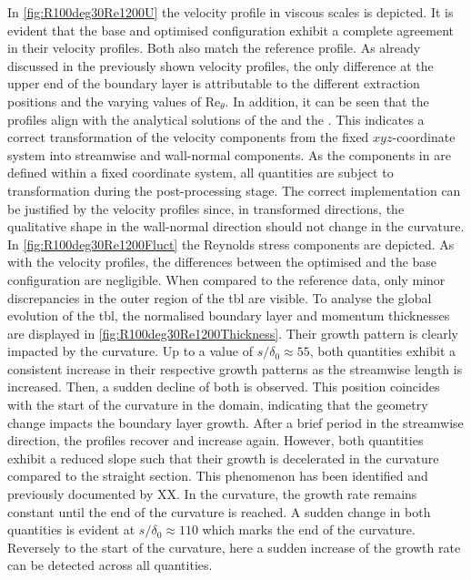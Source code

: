 In \autoref{fig:R100deg30Re1200U} the velocity profile in viscous scales is depicted.
It is evident that the base and optimised configuration exhibit a complete agreement in their velocity profiles.
Both also match the reference profile.
As already discussed in the previously shown velocity profiles, the only difference at the upper end of the boundary layer is attributable to  the different extraction positions and the varying values of $\mathrm{Re}_{\theta}$. 
In addition, it can be seen that the profiles align with  the analytical solutions of the  and the .
This indicates a correct transformation of the velocity components from the fixed $xyz$-coordinate system into streamwise and wall-normal components. 
As the components in  are defined within a fixed coordinate system, all quantities are subject to transformation during the post-processing stage.
The correct implementation can be justified by the velocity profiles since, in transformed directions, the qualitative shape in the wall-normal direction should not change in the curvature.
In \autoref{fig:R100deg30Re1200Fluct} the Reynolds stress components are depicted.
As with the velocity profiles, the differences between the optimised and the base configuration are negligible.
When compared to the reference data, only minor discrepancies  in the outer region of the \acrshort{tbl} are visible.
To analyse the global evolution of the \acrshort{tbl}, the normalised boundary layer and momentum thicknesses are displayed in \autoref{fig:R100deg30Re1200Thickness}.
Their growth pattern is clearly impacted by the curvature.
Up to a value of $s/\delta_0 \approx 55$, both quantities exhibit a consistent increase in their respective growth patterns as the streamwise length is increased.
Then, a sudden decline of both is observed. 
This position coincides with the start of the curvature in the domain, indicating that the geometry change impacts the boundary layer growth.
After a brief period in the streamwise direction, the profiles recover and increase again. 
However, both quantities exhibit a reduced slope such that their growth is decelerated in the curvature compared to the straight section.
This phenomenon has been identified and previously documented  by XX.
In the curvature, the growth rate remains constant until the end of the curvature is reached.
A sudden change in both quantities is evident at $s/\delta_0 \approx 110$ which marks the end of the curvature.
Reversely to the start of the curvature, here a sudden increase of the growth rate can be detected across all quantities.
